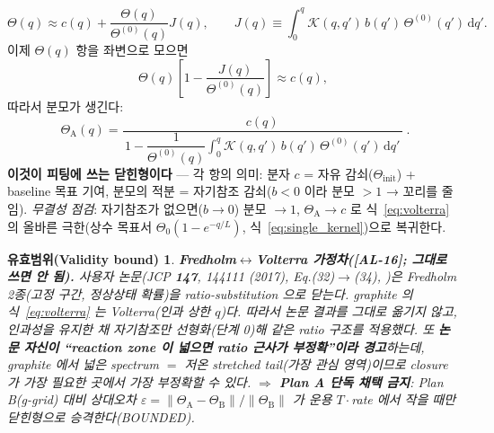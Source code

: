 \documentclass[11pt,a4paper]{article}
\newtheorem*{boundbox}{유효범위(Validity bound)}
\newcommand{\dd}{\mathrm{d}}
\newcommand{\AL}[1]{\textsf{[AL-#1]}}
\begin{document}
\begin{equation*}
\Theta(q)\approx c(q)+\frac{\Theta(q)}{\Theta^{(0)}(q)}
J(q),\qquad
J(q)\equiv\int_0^q\mathcal K(q,q')\,b(q')\,\Theta^{(0)}(q')\,\dd q' .
\end{equation*}
이제 $\Theta(q)$ 항을 좌변으로 모으면
\begin{equation*}
\Theta(q)\left[1-\frac{J(q)}{\Theta^{(0)}(q)}\right]\approx c(q),
\end{equation*}
따라서 분모가 생긴다:
\begin{equation}
\boxed{\;\Theta_\mathrm A(q)=\frac{c(q)}{\,1-\dfrac{1}{\Theta^{(0)}(q)}\displaystyle\int_0^q\mathcal K(q,q')\,b(q')\,\Theta^{(0)}(q')\,\dd q'\,}\;.}
\label{eq:closed}
\end{equation}
\textbf{이것이 피팅에 쓰는 닫힌형이다} — 각 항의 의미: 분자 $c$ = 자유 감쇠($\Theta_\mathrm{init}$) + baseline
목표 기여, 분모의 적분 = 자기참조 감쇠($b<0$ 이라 분모 $>1$ → 꼬리를 줄임). \emph{무결성 점검}: 자기참조가
없으면($b\to0$) 분모 $\to1$, $\Theta_\mathrm A\to c$ 로 식~\eqref{eq:volterra} 의 올바른 극한(상수 목표서
$\Theta_0(1-e^{-q/L})$, 식~\eqref{eq:single_kernel})으로 복귀한다.
\begin{boundbox}
\textbf{Fredholm$\leftrightarrow$Volterra 가정차(\AL{16}; 그대로 쓰면 안 됨).} 사용자 논문(\emph{JCP}
\textbf{147}, 144111 (2017), Eq.(32)$\to$(34), \cite{jcp2017})은 \emph{Fredholm} 2종(고정 구간, 정상상태 확률)을
ratio-substitution 으로 닫는다. graphite 의 식~\eqref{eq:volterra} 는 \emph{Volterra}(인과 상한 $q$)다. 따라서
논문 결과를 그대로 옮기지 않고, 인과성을 유지한 채 자기참조만 선형화(단계 0)해 \emph{같은} ratio 구조를 적용했다.
또 \textbf{논문 자신이 ``reaction zone 이 넓으면 ratio 근사가 부정확''이라 경고}하는데, graphite 에서 넓은
spectrum $=$ 저온 stretched tail(가장 관심 영역)이므로 closure 가 가장 필요한 곳에서 가장 부정확할 수 있다.
$\Rightarrow$ \textbf{Plan A 단독 채택 금지}: Plan B(g-grid) 대비 상대오차
$\varepsilon=\lVert\Theta_\mathrm A-\Theta_\mathrm B\rVert/\lVert\Theta_\mathrm B\rVert$ 가 운용 $T\cdot$rate 에서
작을 때만 닫힌형으로 승격한다(BOUNDED).
\end{boundbox}

\end{document}
